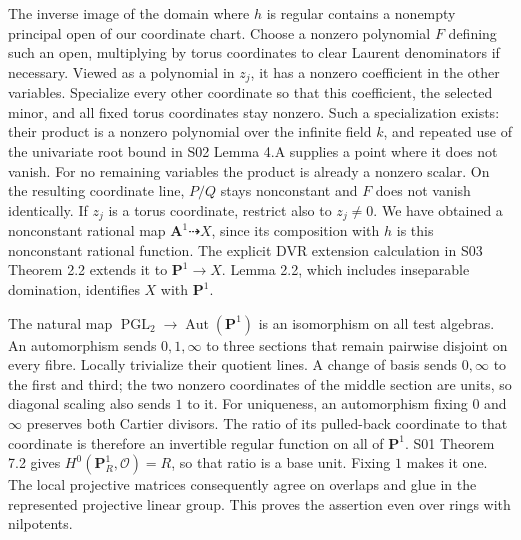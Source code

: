\documentclass[11pt,a4paper,openany]{report}
\newcounter{none}
\begin{document}
The inverse image of the domain where \(h\) is regular contains a nonempty principal open of our coordinate chart. Choose a nonzero polynomial \(F\) defining such an open, multiplying by torus coordinates to clear Laurent denominators if necessary. Viewed as a polynomial in \(z_j\), it has a nonzero coefficient in the other variables. Specialize every other coordinate so that this coefficient, the selected minor, and all fixed torus coordinates stay nonzero. Such a specialization exists: their product is a nonzero polynomial over the infinite field \(k\), and repeated use of the univariate root bound in S02 Lemma 4.A supplies a point where it does not vanish. For no remaining variables the product is already a nonzero scalar. On the resulting coordinate line, \(P/Q\) stays nonconstant and \(F\) does not vanish identically. If \(z_j\) is a torus coordinate, restrict also to \(z_j\ne0\). We have obtained a nonconstant rational map \(\mathbf A^1\dashrightarrow X\), since its composition with \(h\) is this nonconstant rational function. The explicit DVR extension calculation in S03 Theorem 2.2 extends it to \(\mathbf P^1\to X\). Lemma 2.2, which includes inseparable domination, identifies \(X\) with \(\mathbf P^1\).

The natural map \(\operatorname{PGL}_2\to\operatorname{Aut}(\mathbf P^1)\) is an isomorphism on all test algebras. An automorphism sends \(0,1,\infty\) to three sections that remain pairwise disjoint on every fibre. Locally trivialize their quotient lines. A change of basis sends \(0,\infty\) to the first and third; the two nonzero coordinates of the middle section are units, so diagonal scaling also sends \(1\) to it. For uniqueness, an automorphism fixing \(0\) and \(\infty\) preserves both Cartier divisors. The ratio of its pulled-back coordinate to that coordinate is therefore an invertible regular function on all of \(\mathbf P^1\). S01 Theorem 7.2 gives \(H^0(\mathbf P^1_R,\mathcal O)=R\), so that ratio is a base unit. Fixing \(1\) makes it one. The local projective matrices consequently agree on overlaps and glue in the represented projective linear group. This proves the assertion even over rings with nilpotents.
\end{document}
